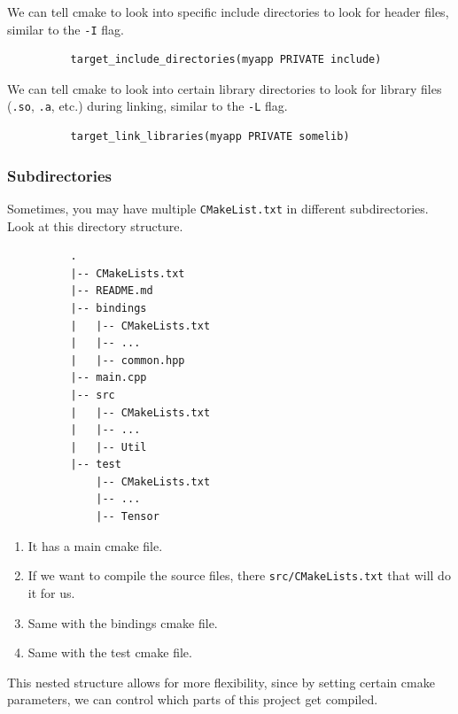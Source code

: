 \documentclass{article}
\newcounter{definition}[section]
\newcounter{example}[section]
\begin{document}
      \begin{definition}
        \label{def:include-directories}
 
        We can tell cmake to look into specific include directories to look for header files, similar to the \texttt{-I} flag. 
        \begin{lstlisting}
          target_include_directories(myapp PRIVATE include)
        \end{lstlisting}
      \end{definition}

      \begin{definition}
        \label{def:link-libraries}
        We can tell cmake to look into certain library directories to look for library files (\texttt{.so}, \texttt{.a}, etc.) during linking, similar to the \texttt{-L} flag. 
        \begin{lstlisting}
          target_link_libraries(myapp PRIVATE somelib)
        \end{lstlisting}
      \end{definition}

    \subsubsection{Subdirectories}
  
      \begin{example}
        \label{ex:motivation-for-multiple-cmake-files}
        Sometimes, you may have multiple \texttt{CMakeList.txt} in different subdirectories. Look at this directory structure. 
        \begin{lstlisting}
          .
          |-- CMakeLists.txt
          |-- README.md
          |-- bindings
          |   |-- CMakeLists.txt
          |   |-- ...
          |   |-- common.hpp
          |-- main.cpp
          |-- src
          |   |-- CMakeLists.txt
          |   |-- ...
          |   |-- Util
          |-- test
              |-- CMakeLists.txt
              |-- ...
              |-- Tensor
        \end{lstlisting}
        \begin{enumerate}
          \item It has a main cmake file. 
          \item If we want to compile the source files, there \texttt{src/CMakeLists.txt} that will do it for us. 
          \item Same with the bindings cmake file. 
          \item Same with the test cmake file. 
        \end{enumerate}
        This nested structure allows for more flexibility, since by setting certain cmake parameters, we can control which parts of this project get compiled. 
      \end{example}
\end{document}
